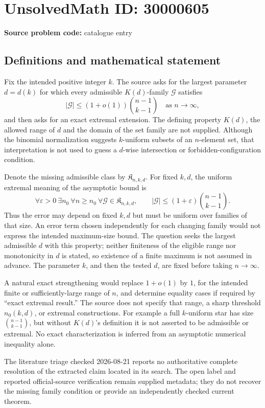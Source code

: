 \documentclass[11pt]{article}
\begin{document}
\section*{UnsolvedMath ID: 30000605}
\textbf{Source problem code:} catalogue entry
\subsection{Definitions and mathematical statement}
Fix the intended positive integer \(k\). The source asks for the largest parameter \(d=d(k)\) for which every admissible \(K(d)\)-family \(\mathcal G\) satisfies
\[
 |\mathcal G|\leq(1+o(1))\binom{n-1}{k-1}
 \quad\text{as }n\to\infty,
\]
and then asks for an exact extremal extension. The defining property \(K(d)\), the allowed range of \(d\) and the domain of the set family are not supplied. Although the binomial normalization suggests \(k\)-uniform subsets of an \(n\)-element set, that interpretation is not used to guess a \(d\)-wise intersection or forbidden-configuration condition.

Denote the missing admissible class by \(\mathfrak K_{n,k,d}\). For fixed \(k,d\), the uniform extremal meaning of the asymptotic bound is
\[
 \forall\varepsilon>0\ \exists n_0\ \forall n\geq n_0
 \ \forall\mathcal G\in\mathfrak K_{n,k,d},\qquad
 |\mathcal G|\leq(1+\varepsilon)\binom{n-1}{k-1}.
\]
Thus the error may depend on fixed \(k,d\) but must be uniform over families of that size. An error term chosen independently for each changing family would not express the intended maximum-size bound. The question seeks the largest admissible \(d\) with this property; neither finiteness of the eligible range nor monotonicity in \(d\) is stated, so existence of a finite maximum is not assumed in advance. The parameter \(k\), and then the tested \(d\), are fixed before taking \(n\to\infty\).

A natural exact strengthening would replace \(1+o(1)\) by \(1\), for the intended finite or sufficiently-large range of \(n\), and determine equality cases if required by ``exact extremal result.'' The source does not specify that range, a sharp threshold \(n_0(k,d)\), or extremal constructions. For example a full \(k\)-uniform star has size \(\binom{n-1}{k-1}\), but without \(K(d)\)'s definition it is not asserted to be admissible or extremal. No exact characterization is inferred from an asymptotic numerical inequality alone.

The literature triage checked 2026-08-21 reports no authoritative complete resolution of the extracted claim located in its search. The open label and reported official-source verification remain supplied metadata; they do not recover the missing family condition or provide an independently checked current theorem.
\end{document}
